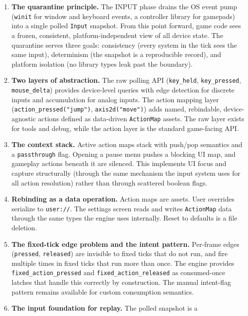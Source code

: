 \documentclass[
  11pt,
  letterpaper,
  DIV=11,
  numbers=noendperiod,
  twoside,
  open=right]{scrreprt}
\begin{document}
\begin{enumerate}
\def\labelenumi{\arabic{enumi}.}
\item
  \textbf{The quarantine principle.} The INPUT phase drains the OS event
  pump (\texttt{winit} for window and keyboard events, a controller
  library for gamepads) into a single polled \texttt{Input} snapshot.
  From this point forward, game code sees a frozen, consistent,
  platform-independent view of all device state. The quarantine serves
  three goals: consistency (every system in the tick sees the same
  input), determinism (the snapshot is a reproducible record), and
  platform isolation (no library types leak past the boundary).
\item
  \textbf{Two layers of abstraction.} The raw polling API
  (\texttt{key\_held}, \texttt{key\_pressed}, \texttt{mouse\_delta})
  provides device-level queries with edge detection for discrete inputs
  and accumulation for analog inputs. The action mapping layer
  (\texttt{action\_pressed("jump")}, \texttt{axis2d("move")}) adds
  named, rebindable, device-agnostic actions defined as data-driven
  \texttt{ActionMap} assets. The raw layer exists for tools and debug,
  while the action layer is the standard game-facing API.
\item
  \textbf{The context stack.} Active action maps stack with push/pop
  semantics and a \texttt{passthrough} flag. Opening a pause menu pushes
  a blocking UI map, and gameplay actions beneath it are silenced. This
  implements UI focus and capture structurally (through the same
  mechanism the input system uses for all action resolution) rather than
  through scattered boolean flags.
\item
  \textbf{Rebinding as a data operation.} Action maps are assets. User
  overrides serialize to \texttt{user://}. The settings screen reads and
  writes \texttt{ActionMap} data through the same types the engine uses
  internally. Reset to defaults is a file deletion.
\item
  \textbf{The fixed-tick edge problem and the intent pattern.} Per-frame
  edges (\texttt{pressed}, \texttt{released}) are invisible to fixed
  ticks that do not run, and fire multiple times in fixed ticks that run
  more than once. The engine provides \texttt{fixed\_action\_pressed}
  and \texttt{fixed\_action\_released} as consumed-once latches that
  handle this correctly by construction. The manual intent-flag pattern
  remains available for custom consumption semantics.
\item
  \textbf{The input foundation for replay.} The polled snapshot is a

\end{enumerate}
\end{document}
